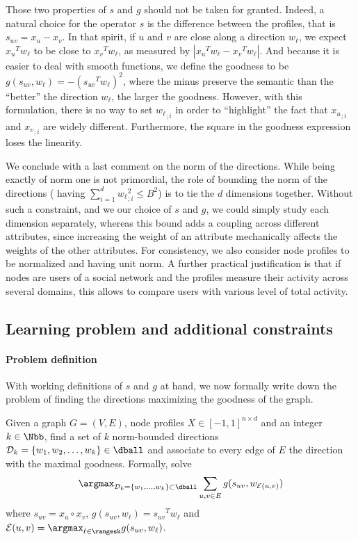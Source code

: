 Those two properties of $s$ and $g$ should not be taken for granted. Indeed, 
a natural choice for the operator $s$ is the difference between the profiles, that is
$s_{uv} = x_u - x_v$. In that spirit, if $u$ and $v$ are close along a direction $w_\ell$, we expect
${x_u}^T w_\ell$ to be close to ${x_v}^T w_\ell$, as measured by $|{x_u}^T w_\ell - {x_v}^T
w_\ell|$. And because it is easier to deal with smooth functions, we define the goodness to be $g(s_{uv},
w_\ell) = -\left({s_{uv}}^T w_\ell \right)^2$, where the minus preserve the semantic than the
\enquote{better} the direction $w_\ell$, the larger the goodness. However, with this formulation,
there is no way to set ${w_\ell}_{;i}$ in order to \enquote{highlight} the fact that ${x_u}_{;i}$
and ${x_v}_{;i}$ are widely different. Furthermore, the square in the goodness expression loses the
linearity.

We conclude with a last comment on the norm of the directions. While being exactly of norm one is
not primordial, the role of bounding the norm of the directions (\ie{} having $\sum_{i=1}^d
{w_\ell}_{;i}^2 \leq B^2$) is to tie the $d$ dimensions together. Without such a constraint, and we
our choice of $s$ and $g$, we could simply study each dimension separately, whereas this bound adds
a coupling across different attributes, since increasing the weight of an attribute mechanically
affects the weights of the other attributes.
For consistency, we also consider node profiles to be normalized and having unit norm. A further
practical justification is that if nodes are users of a social network and the profiles measure
their activity across several domains, this allows to compare users with various level of total
activity.

\subsection{Learning problem and additional constraints}
\label{sub:edge_constraints}

\paragraph{Problem definition}

With working definitions of $s$ and $g$ at hand, we now formally write down the problem of
finding the directions maximizing the goodness of the graph.
\begin{problem}[\ecp{}]
  \label{p:edge_full}
  Given a graph $G=(V, E)$, node profiles $X\in [-1, 1]^{n\times d}$ and an integer $k \in \Nbb$,
  find a set of $k$ norm-bounded directions $\mathcal{D}_k = \{w_1, w_2, \ldots, w_k\} \in \dball$
  and associate to every edge of $E$ the direction with the maximal goodness. Formally, solve
  \begin{equation}
    \label{eq:edge_full}
    \argmax_{\mathcal{D}_k = \{w_1,\ldots,w_k\} \subset \dball}
    \sum_{u,v \in E}  g(s_{uv}, w_{\mathcal{E}(u,v)})
  \end{equation}
  where $s_{uv} = x_u \circ x_v$, $g(s_{uv}, w_{\ell}) = {s_{uv}}^T w_{\ell}$ and $\mathcal{E}(u,v)
  = \argmax_{\ell \in \rangesk} g(s_{uv}, w_\ell)$.
\end{problem}

